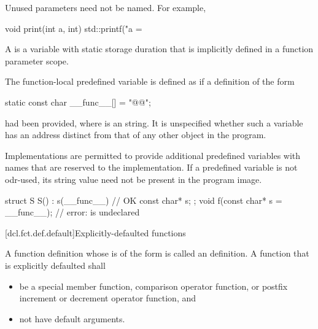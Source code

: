 \pnum
\begin{note}
Unused parameters need not be named.
For example,

\begin{codeblock}
void print(int a, int) {
  std::printf("a = %
}
\end{codeblock}
\end{note}

\pnum
A  is a variable with static
storage duration that is implicitly defined in a function parameter scope.

\pnum
{}%
The function-local predefined variable  is
defined as if a definition of the form
\begin{codeblock}
static const char __func__[] = "@@";
\end{codeblock}
had been provided, where  is an  string.
It is unspecified whether such a variable has an address
distinct from that of any other object in the program.
\begin{footnote}
Implementations are
permitted to provide additional predefined variables with names that are reserved to the
implementation. If a predefined variable is not
odr-used, its string value need not be present in the program image.
\end{footnote}
\begin{example}
\begin{codeblock}
struct S {
  S() : s(__func__) { }             // OK
  const char* s;
};
void f(const char* s = __func__);   // error:  is undeclared
\end{codeblock}
\end{example}

[dcl.fct.def.default]{Explicitly-defaulted functions}%

\pnum
A function definition whose
is of the form
is called an  definition.
A function that is explicitly defaulted shall
\begin{itemize}
\item be a special member function,
comparison operator function, or
postfix increment or decrement operator function,
and
\item not have default arguments.
\end{itemize}

